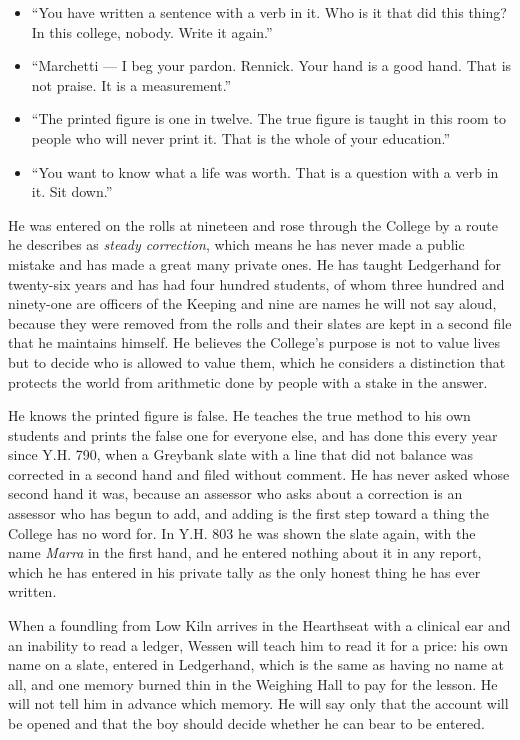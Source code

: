 \documentclass{design/chronicle}
\begin{document}
{\begin{itemize}[leftmargin=1.4em,itemsep=1pt,topsep=3pt,parsep=0pt]
\item “You have written a sentence with a verb in it. Who is it that did this thing? In this college, nobody. Write it again.”

\item “Marchetti — I beg your pardon. Rennick. Your hand is a good hand. That is not praise. It is a measurement.”

\item “The printed figure is one in twelve. The true figure is taught in this room to people who will never print it. That is the whole of your education.”

\item “You want to know what a life was worth. That is a question with a verb in it. Sit down.”

\end{itemize}

He was entered on the rolls at nineteen and rose through the College by a route he describes as \emph{steady correction}, which means he has never made a public mistake and has made a great many private ones. He has taught Ledgerhand for twenty-six years and has had four hundred students, of whom three hundred and ninety-one are officers of the Keeping and nine are names he will not say aloud, because they were removed from the rolls and their slates are kept in a second file that he maintains himself. He believes the College’s purpose is not to value lives but to decide who is allowed to value them, which he considers a distinction that protects the world from arithmetic done by people with a stake in the answer.

He knows the printed figure is false. He teaches the true method to his own students and prints the false one for everyone else, and has done this every year since Y.H. 790, when a Greybank slate with a line that did not balance was corrected in a second hand and filed without comment. He has never asked whose second hand it was, because an assessor who asks about a correction is an assessor who has begun to add, and adding is the first step toward a thing the College has no word for. In Y.H. 803 he was shown the slate again, with the name \emph{Marra} in the first hand, and he entered nothing about it in any report, which he has entered in his private tally as the only honest thing he has ever written.

When a foundling from Low Kiln arrives in the Hearthseat with a clinical ear and an inability to read a ledger, Wessen will teach him to read it for a price: his own name on a slate, entered in Ledgerhand, which is the same as having no name at all, and one memory burned thin in the Weighing Hall to pay for the lesson. He will not tell him in advance which memory. He will say only that the account will be opened and that the boy should decide whether he can bear to be entered.

}
\end{document}
